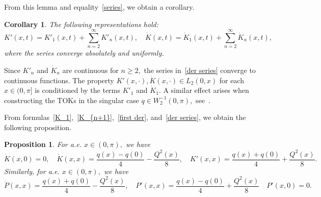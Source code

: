\documentclass[a4paper, 12pt] {article}
\theoremstyle{plain}
\newtheorem{corollary}{\indent Corollary}
\newtheorem{proposition}{\indent Proposition}
\theoremstyle{remark}
\theoremstyle{plain}
\theoremstyle{definition}
\numberwithin{equation}{section}
\begin{document}
From this lemma and equality~\eqref{series}, we obtain a corollary.
\begin{corollary}
The following representations hold:
\begin{equation} \label{der series}
K'(x, t) = K'_1(x,t) + \sum_{n=2}^\infty K'_{n}(x, t), \quad \dot K(x, t) = \dot K_1(x,t) + \sum_{n=2}^\infty \dot K_{n}(x, t),
\end{equation}
where the series converge absolutely and uniformly.
\end{corollary}

Since $K'_n$ and $\dot K_n$ are continuous for $n \ge 2,$ the series in~\eqref{der series} converge to continuous functions.
The property $K'(x, \cdot), \dot{K}(x, \cdot) \in L_2(0, x)$ for each $x \in (0, \pi]$ is conditioned by the terms $K'_1$ and $\dot K_1.$ A similar effect arises when constructing the TOKs in the singular case $q \in W^{-1}_2(0, \pi),$ see~\cite{addendum}.

From formulas~\eqref{K_1},~\eqref{K_{n+1}},~\eqref{first der}, and~\eqref{der series}, we obtain the following proposition.
\begin{proposition} \label{K'(x, x)}
For a.e. $x \in (0, \pi),$ we have
$$ \dot K(x, 0) = 0, \quad \dot K(x, x) = \frac{q(x) - q(0)}{4} - \frac{Q^2(x)}{8}, \quad K'(x, x) = \frac{q(x) + q(0)}{4} + \frac{Q^2(x)}{8}.$$
Similarly, for a.e. $x \in (0, \pi),$ we have
$$ \dot P(x, x) = \frac{q(x) + q(0)}{4} - \frac{Q^2(x)}{8}, \quad P'(x, x) = \frac{q(x) - q(0)}{4} + \frac{Q^2(x)}{8} \quad P'(x, 0) = 0. $$
\end{proposition}
\end{document}
